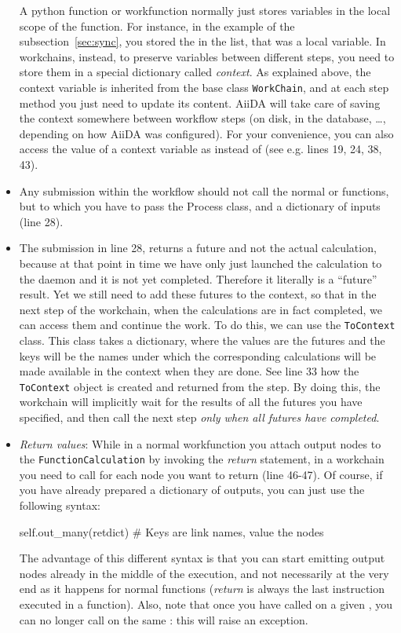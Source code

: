 \begin{itemize}
 A python function or workfunction normally just stores variables in the local scope of the function.
 For instance, in the example of the subsection~\ref{sec:sync}, you stored the  in the  list, that was a local variable.
 In workchains, instead, to preserve variables between different steps, you need to store them in a special dictionary called \emph{context}.
 As explained above, the context variable  is inherited from the base class \texttt{WorkChain}, and at each step method you just need to update its content.
 AiiDA will take care of saving the context somewhere between workflow steps (on disk, in the database, \ldots{}, depending on how AiiDA was configured).
 For your convenience,  you can also access the value of a context variable as  instead of  (see e.g. lines 19, 24, 38, 43).
 \item Any submission within the workflow should not call the normal  or  functions, but  to which you have to pass the Process class, and a dictionary of inputs (line 28).
 \item The submission in line 28, returns a future and not the actual calculation, because at that point in time we have only just launched the calculation to the daemon and it is not yet completed. Therefore it literally is a ``future'' result. Yet we still need to add these futures to the context, so that in the next step of the workchain, when the calculations are in fact completed, we can access them and continue the work. To do this, we can use the \texttt{ToContext} class. This class takes a dictionary, where the values are the futures and the keys will be the names under which the corresponding calculations will be made available in the context when they are done. See line 33 how the \texttt{ToContext} object is created and returned from the step.
 By doing this, the workchain will implicitly wait for the results of all the futures you have specified, and then call the next step \emph{only when all futures have completed}.
 \item \emph{Return values}: While in a normal workfunction you attach output nodes to the \texttt{FunctionCalculation} by invoking the \textit{return} statement, in a workchain you need to call  for each node you want to return (line 46-47). Of course, if you have already prepared a dictionary of outputs, you can just use the following syntax:
\begin{pythoncommand}
self.out_many(retdict)  # Keys are link names, value the nodes
\end{pythoncommand}


The advantage of this different syntax is that you can start emitting output nodes already in the middle of the execution, and not necessarily at the very end as it happens for normal functions (\textit{return} is always the last instruction executed in a function). Also, note that once you have called  on a given , you can no longer call  on the same : this will raise an exception.
\end{itemize}

